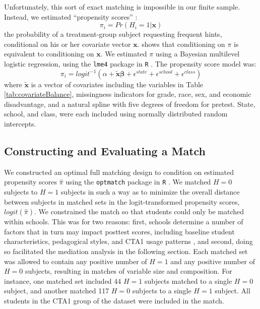 \documentclass{article}\usepackage[]{graphicx}\usepackage[]{color}
\begin{document}
Unfortunately, this sort of exact matching is impossible in our finite
sample.
Instead, we estimated ``propensity scores'' \citep{rosenbaum1983central}:
\begin{equation*}
\pi_i=Pr(H_i=1|\bm{x})
\end{equation*}
the probability of a treatment-group subject requesting frequent hints, conditional on
his or her covariate vector $\bm{x}$.
\citet{rosenbaum1983central} shows that conditioning on $\pi$ is
equivalent to conditioning on $\bm{x}$.
We estimated $\pi$ using a Bayesian multilevel logistic regression,
using the \texttt{lme4} package in
\texttt{R} \citep{lme4}.
The propensity score model was:
\begin{equation*}
\pi_i=logit^{-1}(\alpha+\bm{\tilde{x}}\bm{\beta}+\epsilon^{state}+\epsilon^{school}+\epsilon^{class})
\end{equation*}
where $\bm{\tilde{x}}$ is a vector of covariates including the
variables in Table \ref{tab:covariateBalance}, missingness
indicators for grade, race, sex, and economic disadvantage, and
a natural spline with five degrees of freedom for pretest.
State, school, and class, were each included using normally
distributed random intercepts.

\subsection{Constructing and Evaluating a Match}

We constructed an optimal full matching design \citep{hansen2004} to
condition on estimated propensity scores $\hat{\pi}$ using the
\texttt{optmatch} package in \texttt{R} \citep{optmatch}.
We matched $H=0$ subjects to $H=1$ subjects in such a way as
to minimize the overall distance between subjects in matched sets in
the logit-transformed propensity scores, $logit(\hat{\pi})$.
We constrained the match so that students could only be matched within
schools.
This was for two reasons: first, schools determine a number of factors
that in turn may impact posttest scores, including baseline
student characteristics, pedagogical styles, and CTA1 usage patterns
\citep[see][]{descriptivePaper}, and second, doing so facilitated the mediation
analysis in the following section.
Each matched set was allowed to contain any positive number of $H=1$
and any positive number of $H=0$ subjects, resulting in matches of
variable size and composition.
For instance, one matched set included 44 $H=1$ subjects matched to a
single $H=0$ subject, and another matched 117 $H=0$ subjects to a
single $H=1$ subject.
All students in the CTA1 group of the dataset were included in the match.
\end{document}
